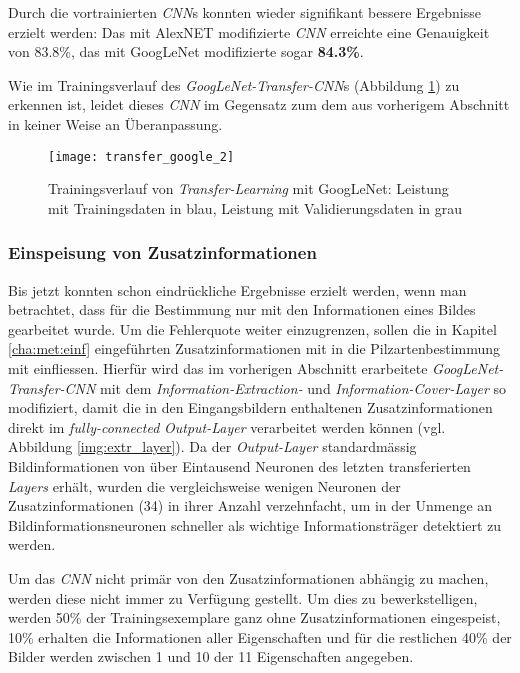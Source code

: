 Durch die vortrainierten \textit{CNN}s konnten wieder signifikant bessere Ergebnisse erzielt werden: Das mit AlexNET modifizierte \textit{CNN} erreichte eine Genauigkeit von 83.8\%, das mit GoogLeNet modifizierte sogar \textbf{84.3\%}.

Wie im Trainingsverlauf des \textit{GoogLeNet-Transfer-CNN}s (Abbildung \ref{img:transfer_cnn}) zu erkennen ist, leidet dieses \textit{CNN} im Gegensatz zum dem aus vorherigem Abschnitt in keiner Weise an Überanpassung.

\begin{figure}[h]
	\centering
	\texttt{[image: transfer\_google\_2]}
	\caption[Trainingsverlauf \textit{Transfer-Learning}]{Trainingsverlauf von \textit{Transfer-Learning} mit GoogLeNet: Leistung mit Trainingsdaten in blau, Leistung mit Validierungsdaten in grau}
	\label{img:transfer_cnn}
\end{figure}

\subsubsection{Einspeisung von Zusatzinformationen} \label{cha:met:einfimpl}
Bis jetzt konnten schon eindrückliche Ergebnisse erzielt werden, wenn man betrachtet, dass für die Bestimmung nur mit den Informationen eines Bildes gearbeitet wurde. Um die Fehlerquote weiter einzugrenzen, sollen die in Kapitel \ref{cha:met:einf} eingeführten Zusatzinformationen mit in die Pilzartenbestimmung mit einfliessen. Hierfür wird das im vorherigen Abschnitt erarbeitete \textit{GoogLeNet-Transfer-CNN} mit dem \textit{Information-Extraction-} und \textit{Information-Cover-Layer} so modifiziert, damit die in den Eingangsbildern enthaltenen Zusatzinformationen direkt im \textit{fully-connected} \textit{Output-Layer} verarbeitet werden können (vgl. Abbildung \ref{img:extr_layer}). Da der \textit{Output-Layer} standardmässig Bildinformationen von über Eintausend Neuronen des letzten transferierten \textit{Layers} erhält, wurden die vergleichsweise wenigen Neuronen der Zusatzinformationen (34) in ihrer Anzahl verzehnfacht, um in der Unmenge an Bildinformationsneuronen schneller als wichtige Informationsträger detektiert zu werden.

Um das \textit{CNN} nicht primär von den Zusatzinformationen abhängig zu machen, werden diese nicht immer zu Verfügung gestellt. Um dies zu bewerkstelligen, werden 50\% der Trainingsexemplare ganz ohne Zusatzinformationen eingespeist, 10\% erhalten die Informationen aller Eigenschaften und für die restlichen 40\% der Bilder werden zwischen 1 und 10 der 11 Eigenschaften angegeben.


